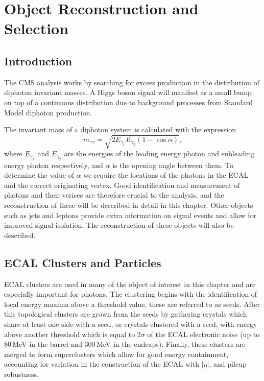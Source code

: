 \chapter{Object Reconstruction and Selection}
\label{chap:object_reco}

\newpage

\section{Introduction}

The CMS \Hgg analysis works by searching for excess production in the distribution of diphoton invariant masses. A Higgs boson signal will manifest as a small bump on top of a continuous distribution due to background processes from Standard Model diphoton production.

The invariant mass of a diphoton system is calculated with the expression
\begin{equation}
    m_{\gamma\gamma} = \sqrt{2E_{\gamma_1}E_{\gamma_2}(1-\cos{\alpha})},
\end{equation}
where $E_{\gamma_1}$ and $E_{\gamma_2}$ are the energies of the leading energy photon and subleading energy photon respectively, and $\alpha$ is the opening angle between them. 
To determine the value of $\alpha$ we require the locations of the photons in the ECAL and the correct originating vertex. 
Good identification and measurement of photons and their verices are therefore crucial to the analysis, and the reconstruction of these will be described in detail in this chapter. 
Other objects such as jets and leptons provide extra information on signal events and allow for improved signal isolation. The reconstruction of these objects will also be described.

\section{ECAL Clusters and Particles}

ECAL clusters are used in many of the object of interest in this chapter and are especially important for photons. 
The clustering \cite{cmsEcalCalibration} begins with the identification of local energy maxima above a threshold value, these are referred to as seeds. 
After this topological clusters are grown from the seeds by gathering crystals which share at least one side with a seed, or crystals clustered with a seed, with energy above another threshold which is equal to $2\sigma$ of the ECAL electronic noise (up to 80\,MeV in the barrel and 300\,MeV in the endcaps).
Finally, these clusters are merged to form superclusters which allow for good energy containment, accounting for variation in the construction of the ECAL with $|\eta|$, and pileup robustness.



